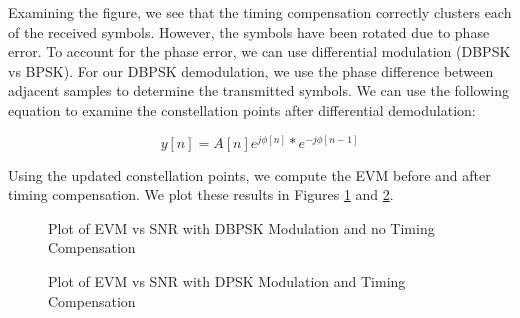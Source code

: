 \documentclass{article}
\begin{document}
\noindent Examining the figure, we see that the timing compensation correctly clusters each of the received symbols. However, the symbols have been rotated due to phase error. To account for the phase error, we can use differential modulation (DBPSK vs BPSK). For our DBPSK demodulation, we use the phase difference between adjacent samples to determine the transmitted symbols. We can use the following equation to examine the constellation points after differential demodulation:

\begin{equation}
	y[n] = A[n]e^{j\phi[n]}*e^{-j\phi[n-1]}
	\label{eq::dbpsk}
\end{equation}

\noindent Using the updated constellation points, we compute the EVM before and after timing compensation. We plot these results in Figures \ref{fig::evm_vs_snr_dbpsk_no_comp} and \ref{fig::evm_vs_snr_dbpsk}.

\begin{figure}[H]
	\centerline{}
	\caption{Plot of EVM vs SNR with DBPSK Modulation and no Timing Compensation}
	\label{fig::evm_vs_snr_dbpsk_no_comp}
\end{figure}

\begin{figure}[H]
	\centerline{}
	\caption{Plot of EVM vs SNR with DPSK Modulation and Timing Compensation}
	\label{fig::evm_vs_snr_dbpsk}
\end{figure}
\end{document}
